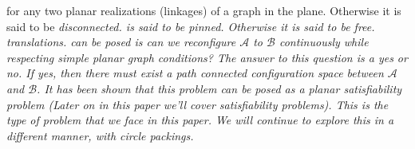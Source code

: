 for any two planar realizations (linkages) of a graph in the plane.  Otherwise it is said to be 
\it{disconnected}.
is said to be \it{pinned}. Otherwise it is said to be \it{free}.
translations.
can be posed is can we reconfigure $\mathcal{A}$ to $\mathcal{B}$ continuously while respecting 
simple planar graph conditions?  The answer to this question is a yes or no.  If yes, then there 
must exist a path connected configuration space between $\mathcal{A}$ and $\mathcal{B}$.  It has 
been shown that this problem can be posed as a planar satisfiability problem 
\cite{Breu19983,mulzer2008minimum} (Later on in this paper we'll cover satisfiability problems).  
This is the type of problem that we face in this paper.  We will continue to explore this in a 
different manner, with circle packings.
\newpage 
